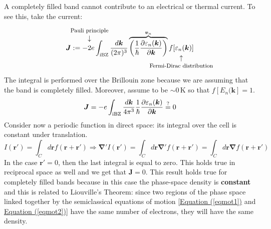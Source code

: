 \documentclass[10.75pt,a4paper,openright,bottom=2cm]{article}
\renewcommand{\Vec}[1]{\boldsymbol{#1}}
\renewcommand{\refeq}[1]{\hyperref[#1]{Equation (\ref{#1})}}
\newcommand{\RN}[1]{%
  \textup{\uppercase\expandafter{\romannumeral#1}}%
}
\begin{document}
A completely filled band cannot contribute to an electrical or thermal current. To see this, take the current:
\[
\Vec{J}:=-\overset{\mathclap{\tikz \node {$\downarrow$} node [above=1ex] {\footnotesize Pauli principle };}}{2}e\int_{\text{\RN{1}BZ}}\frac{d\Vec{k}}{(2\pi)^3}\overbrace{\left(\frac{1}{\hbar}\frac{\partial \varepsilon_n(\Vec{k})}{\partial\Vec{k}}\right)}^{\Vec{v}_n}\underset{\mathclap{\tikz \node {$\uparrow$} node [below=1ex] {\footnotesize Fermi-Dirac distribution};}}{f[\varepsilon_n(\Vec{k})]}
\]
The integral is performed over the  Brillouin zone because we are assuming that the band is completely filled. Moreover, assume to be $\sim0$\,K so that $f[E_n(\Vec{k}]=1$.
\[
\Vec{J}=-e\int_{\text{\RN{1}BZ}}\frac{d\Vec{k}}{4\pi^3}\frac{1}{\hbar}\frac{\partial \varepsilon_n(\Vec{k})}{\partial\Vec{k}}\stackrel{?}{=}0
\]
Consider now a periodic function in direct space: its integral over the cell is constant under translation.
\[
I(\Vec{r'})=\int_Cd\Vec{r}f(\Vec{r}+\Vec{r'})\Rightarrow\Vec{\nabla'}I(\Vec{r'})=\int_Cd\Vec{r}\Vec{\nabla'}f(\Vec{r}+\Vec{r'})=\int_Cd\Vec{r}\Vec{\nabla}f(\Vec{r}+\Vec{r'})
\]
In the case $\Vec{r'}=0$, then the last integral is equal to zero. This holds true in reciprocal space as well and we get that $\Vec{J}=0$. This result holds true for completely filled bands because in this case the phase-space density is \textbf{constant} and this is related to Liouville's Theorem: since two regions of the phase space linked together by the semiclassical equations of motion [\refeq{eqmot1} and \refeq{eqmot2}] have the same number of electrons, they will have the same density.
\end{document}

